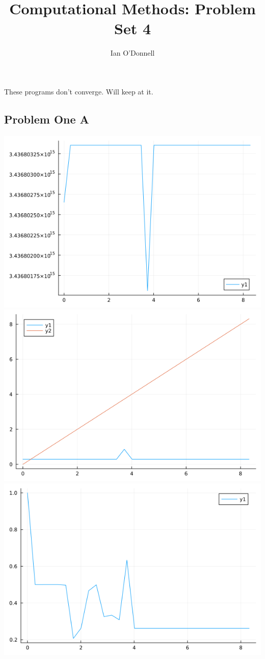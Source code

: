 \documentclass{article}
\title{Computational Methods: Problem Set 4}
\author{Ian O'Donnell}
\date{\vspace{-5ex}}
\begin{document}
\maketitle

These programs don't converge. Will keep at it. 

\subsection*{Problem One A}

\includegraphics[scale = 0.5]{value.png} \\
\includegraphics[scale = 0.5]{capital.png}\\
\includegraphics[scale = 0.5]{labour.png}\\
\end{document}
